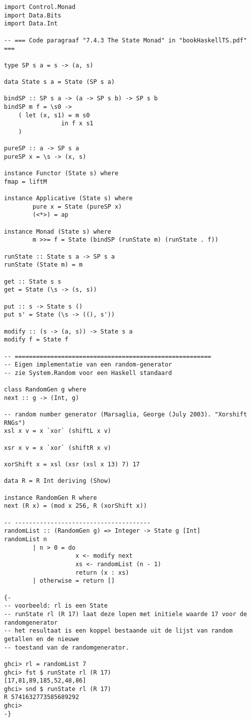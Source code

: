 \documentclass[kulak]{kulakarticle}
\begin{document}
	\begin{verbatim}
import Control.Monad
import Data.Bits
import Data.Int

-- === Code paragraaf "7.4.3 The State Monad" in "bookHaskellTS.pdf" ===

type SP s a = s -> (a, s)

data State s a = State (SP s a)

bindSP :: SP s a -> (a -> SP s b) -> SP s b
bindSP m f = \s0 ->
	( let (x, s1) = m s0
				in f x s1
	)

pureSP :: a -> SP s a
pureSP x = \s -> (x, s)

instance Functor (State s) where
fmap = liftM

instance Applicative (State s) where
		pure x = State (pureSP x)
		(<*>) = ap

instance Monad (State s) where
		m >>= f = State (bindSP (runState m) (runState . f))

runState :: State s a -> SP s a
runState (State m) = m

get :: State s s
get = State (\s -> (s, s))

put :: s -> State s ()
put s' = State (\s -> ((), s'))

modify :: (s -> (a, s)) -> State s a
modify f = State f

-- =======================================================
-- Eigen implementatie van een random-generator
-- zie System.Random voor een Haskell standaard

class RandomGen g where
next :: g -> (Int, g)

-- random number generator (Marsaglia, George (July 2003). "Xorshift RNGs")
xsl x v = x `xor` (shiftL x v)

xsr x v = x `xor` (shiftR x v)

xorShift x = xsl (xsr (xsl x 13) 7) 17

data R = R Int deriving (Show)

instance RandomGen R where
next (R x) = (mod x 256, R (xorShift x))

-- --------------------------------------
randomList :: (RandomGen g) => Integer -> State g [Int]
randomList n
		| n > 0 = do
					x <- modify next
					xs <- randomList (n - 1)
					return (x : xs)
		| otherwise = return []

{-
-- voorbeeld: rl is een State
-- runState rl (R 17) laat deze lopen met initiele waarde 17 voor de randomgenerator
-- het resultaat is een koppel bestaande uit de lijst van random getallen en de nieuwe
-- toestand van de randomgenerator.

ghci> rl = randomList 7
ghci> fst $ runState rl (R 17)
[17,81,89,185,52,48,86]
ghci> snd $ runState rl (R 17)
R 5741632773585689292
ghci>
-}
	\end{verbatim}
\end{document}
